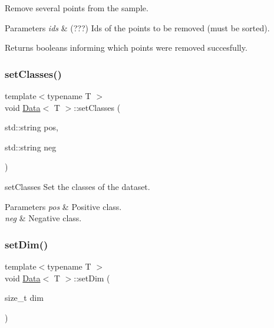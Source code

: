 Remove several points from the sample. 


\begin{DoxyParams}{Parameters}
{\em ids} & (???) Ids of the points to be removed (must be sorted). \\
\hline
\end{DoxyParams}
\begin{DoxyReturn}{Returns}
booleans informing which points were removed succesfully. 
\end{DoxyReturn}
\mbox{\label{class_data_a6d29f9fc923c3f7c258b93330130f056}} 
\subsubsection{\texorpdfstring{set\+Classes()}{setClasses()}}
{\footnotesize\ttfamily template$<$typename T $>$ \\
void \hyperlink{class_data}{Data}$<$ T $>$\+::set\+Classes (\begin{DoxyParamCaption}\item[{std\+::string}]{pos,  }\item[{std\+::string}]{neg }\end{DoxyParamCaption})}



set\+Classes Set the classes of the dataset. 


\begin{DoxyParams}{Parameters}
{\em pos} & Positive class. \\
\hline
{\em neg} & Negative class. \\
\hline
\end{DoxyParams}
\mbox{\label{class_data_ad6e602802e593e4700b3746de55f890b}} 
\subsubsection{\texorpdfstring{set\+Dim()}{setDim()}}
{\footnotesize\ttfamily template$<$typename T $>$ \\
void \hyperlink{class_data}{Data}$<$ T $>$\+::set\+Dim (\begin{DoxyParamCaption}\item[{size\+\_\+t}]{dim }\end{DoxyParamCaption})}



